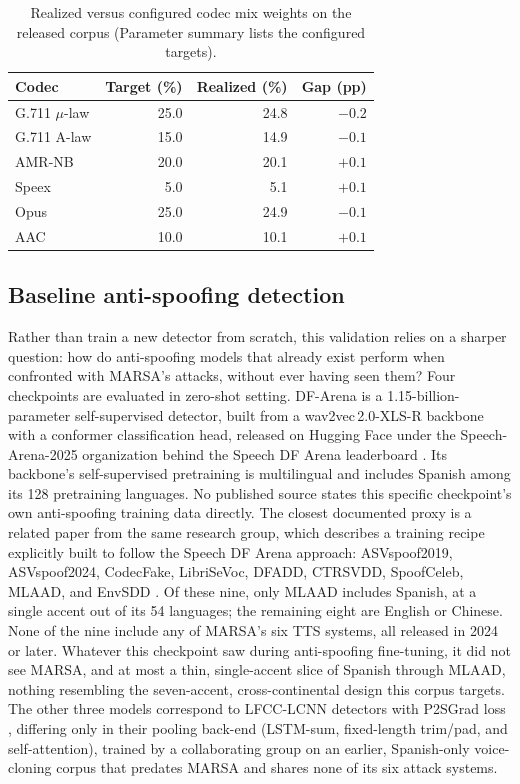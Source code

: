 \documentclass[11pt]{article}
\begin{document}
\begin{table}[H]
\centering
\caption{Realized versus configured codec mix weights on the released
corpus (Parameter summary lists the configured targets).}
\label{tab:codecfidelity}
\small
\begin{tabular}{lrrr}
\toprule
\textbf{Codec} & \textbf{Target (\%)} & \textbf{Realized (\%)} & \textbf{Gap (pp)} \\
\midrule
G.711 $\mu$-law & 25.0 & 24.8 & $-0.2$ \\
G.711 A-law     & 15.0 & 14.9 & $-0.1$ \\
AMR-NB          & 20.0 & 20.1 & $+0.1$ \\
Speex           &  5.0 &  5.1 & $+0.1$ \\
Opus            & 25.0 & 24.9 & $-0.1$ \\
AAC             & 10.0 & 10.1 & $+0.1$ \\
\bottomrule
\end{tabular}
\end{table}

\FloatBarrier
\subsection*{Baseline anti-spoofing detection}

Rather than train a new detector from scratch, this validation relies on a
sharper question: how do anti-spoofing models that already exist perform when
confronted with MARSA's attacks, without ever having seen them? Four
checkpoints are evaluated in zero-shot setting. DF-Arena is a
1.15-billion-parameter self-supervised detector, built from a
wav2vec\,2.0-XLS-R backbone \citep{babu2022xlsr} with a conformer
classification head, released on Hugging Face under the
Speech-Arena-2025 organization behind the Speech DF Arena leaderboard
\citep{dowerah2025speechdfarena}. Its backbone's self-supervised
pretraining is multilingual and includes Spanish among its 128
pretraining languages. No published source states this specific
checkpoint's own anti-spoofing training data directly. The closest
documented proxy is a related paper from the same research group,
which describes a training recipe explicitly built to follow the
Speech DF Arena approach: ASVspoof2019, ASVspoof2024, CodecFake,
LibriSeVoc, DFADD, CTRSVDD, SpoofCeleb, MLAAD, and EnvSDD
\citep{raptor2026}. Of these nine, only MLAAD includes Spanish, at a
single accent out of its 54 languages; the remaining eight are English
or Chinese. None of the nine include any of MARSA's six TTS systems,
all released in 2024 or later. Whatever this checkpoint saw during
anti-spoofing fine-tuning, it did not see MARSA, and at most a thin,
single-accent slice of Spanish through MLAAD, nothing resembling the
seven-accent, cross-continental design this corpus targets. The
other three models correspond to LFCC-LCNN detectors with P2SGrad loss
\citep{wang2021comparative}, differing only in their pooling back-end
(LSTM-sum, fixed-length trim/pad, and self-attention), trained by a
collaborating group on an earlier, Spanish-only voice-cloning corpus
that predates MARSA and shares none of its six attack systems. 
\end{document}
